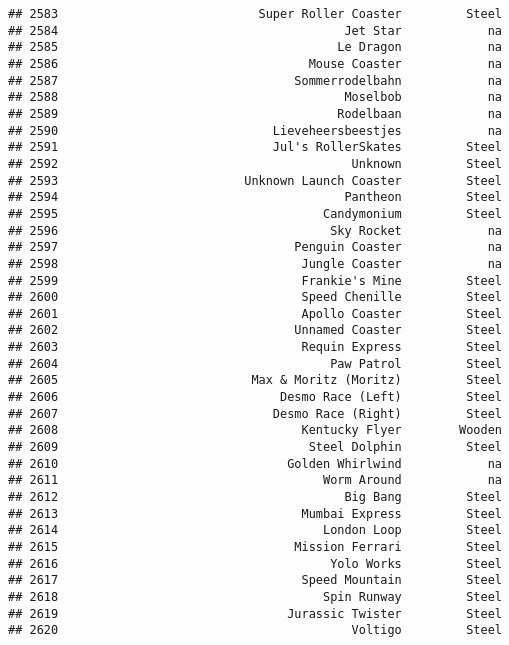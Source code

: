 \documentclass[
]{article}
\begin{document}
\begin{verbatim}
## 2583                            Super Roller Coaster         Steel
## 2584                                        Jet Star            na
## 2585                                       Le Dragon            na
## 2586                                   Mouse Coaster            na
## 2587                                 Sommerrodelbahn            na
## 2588                                        Moselbob            na
## 2589                                       Rodelbaan            na
## 2590                              Lieveheersbeestjes            na
## 2591                              Jul's RollerSkates         Steel
## 2592                                         Unknown         Steel
## 2593                          Unknown Launch Coaster         Steel
## 2594                                        Pantheon         Steel
## 2595                                     Candymonium         Steel
## 2596                                      Sky Rocket            na
## 2597                                 Penguin Coaster            na
## 2598                                  Jungle Coaster            na
## 2599                                  Frankie's Mine         Steel
## 2600                                  Speed Chenille         Steel
## 2601                                  Apollo Coaster         Steel
## 2602                                 Unnamed Coaster         Steel
## 2603                                  Requin Express         Steel
## 2604                                      Paw Patrol         Steel
## 2605                           Max & Moritz (Moritz)         Steel
## 2606                               Desmo Race (Left)         Steel
## 2607                              Desmo Race (Right)         Steel
## 2608                                  Kentucky Flyer        Wooden
## 2609                                   Steel Dolphin         Steel
## 2610                                Golden Whirlwind            na
## 2611                                     Worm Around            na
## 2612                                        Big Bang         Steel
## 2613                                  Mumbai Express         Steel
## 2614                                     London Loop         Steel
## 2615                                 Mission Ferrari         Steel
## 2616                                      Yolo Works         Steel
## 2617                                  Speed Mountain         Steel
## 2618                                     Spin Runway         Steel
## 2619                                Jurassic Twister         Steel
## 2620                                         Voltigo         Steel

\end{verbatim}
\end{document}
